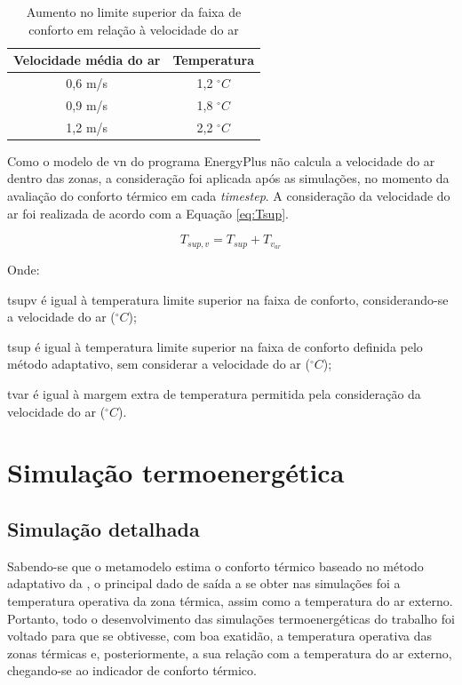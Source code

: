 \begin{table}[h]
	\centering
	\caption{Aumento no limite superior da faixa de conforto em relação à velocidade do ar}
	\label{table:var}
	\begin{tabular}{|c |c |}
		\hline
		\textbf{Velocidade média do ar} & \textbf{Temperatura} \\
		\hline
		0,6 m/s & 1,2 $^{\circ}C$ \\
		\hline
		0,9 m/s & 1,8 $^{\circ}C$ \\
		\hline
		1,2 m/s & 2,2 $^{\circ}C$ \\
		\hline 
	\end{tabular}
\end{table}

Como o modelo de \acrlong{vn} do programa EnergyPlus não calcula a velocidade do ar dentro das zonas, a consideração foi aplicada após as simulações, no momento da avaliação do conforto térmico em cada \textit{timestep}. A consideração da velocidade do ar foi realizada de acordo com a Equação \ref{eq:Tsup}.

\begin{equation}
\label{eq:Tsup}
T_{sup,v} = T_{sup} + T_{v_{ar}}
\end{equation}

Onde:

\gls{tsupv} é igual à temperatura limite superior na faixa de conforto, considerando-se a velocidade do ar ($^{\circ}C$);

\gls{tsup} é igual à temperatura limite superior na faixa de conforto definida pelo método adaptativo, sem considerar a velocidade do ar ($^{\circ}C$);

\gls{tvar} é igual à margem extra de temperatura permitida pela consideração da velocidade do ar ($^{\circ}C$).
\\

\section{Simulação termoenergética}

\subsection{Simulação detalhada}

Sabendo-se que o metamodelo estima o conforto térmico baseado no método adaptativo da , o principal dado de saída a se obter nas simulações foi a temperatura operativa da zona térmica, assim como a temperatura do ar externo. Portanto, todo o desenvolvimento das simulações termoenergéticas do trabalho foi voltado para que se obtivesse, com boa exatidão, a temperatura operativa das zonas térmicas e, posteriormente, a sua relação com a temperatura do ar externo, chegando-se ao indicador de conforto térmico.

